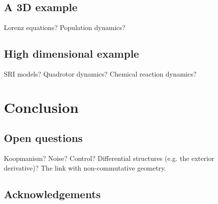 \documentclass[12pt]{amsart}
\begin{document}
\subsection{A 3D example}
Lorenz equations?  Population dynamics?

\subsection{High dimensional example}
SRI models?  Quadrotor dynamics?  Chemical reaction dynamics?

\section{Conclusion}

\subsection{Open questions}
Koopmanism?  Noise?  Control?  Differential structures (e.g. the exterior derivative)?  The link with non-commutative geometry.

\subsection{Acknowledgements}



\end{document}
